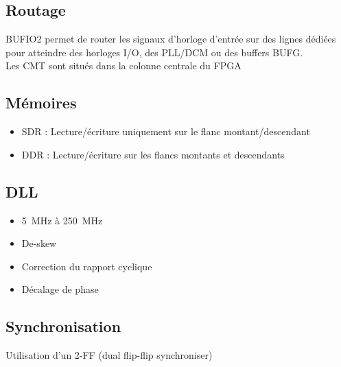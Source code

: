 \documentclass[resume]{subfiles}
\begin{document}
\subsection{Routage}
BUFIO2 permet de router les signaux d'horloge d'entrée sur des lignes dédiées pour atteindre des horloges I/O, des PLL/DCM ou des buffers BUFG.\\
Les CMT sont situés dans la colonne centrale du FPGA
\subsection{Mémoires}
\begin{itemize}
\item SDR : Lecture/écriture uniquement sur le flanc montant/descendant
\item DDR : Lecture/écriture sur les flancs montants et descendants
\end{itemize}
\subsection{DLL}
\begin{itemize}
\item \SI{5}{\mega\hertz} à \SI{250}{\mega\hertz}
\item De-skew
\item Correction du rapport cyclique
\item Décalage de phase
\end{itemize}
\subsection{Synchronisation}
Utilisation d'un 2-FF (dual flip-flip synchroniser)
\end{document}
